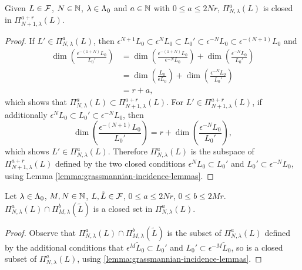 \documentclass[a4paper, 11pt, twoside]{report}
\begin{document}
\begin{lemma}\label{lemma:nesting-subvarieties}
Given $L\in\mathcal{F}$, $N\in\mathbb{N}$, $\lambda\in\Lambda_0{}$ and $a\in\mathbb{N}$ with $0\le a\le 2Nr$, $\Pi_{N,\lambda}^a(L)$ is closed in $\Pi_{N+1,\lambda}^{a+r}(L)$.
\end{lemma}

\begin{proof}
If $L'\in\Pi_{N,\lambda}^{a}(L)$, then $\epsilon^{N+1}L_0\subset \epsilon^N L_0\subset L_0'\subset\epsilon^{-N}L_0\subset\epsilon^{-(N+1)}L_0$ and
\begin{align*}
\dim\left(\frac{\epsilon^{-(1+N)}L_0}{L_0'}\right)
&=\dim\left(\frac{\epsilon^{-(1+N)}L_0}{\epsilon^{-N}L_0}\right) +\dim\left(\frac{\epsilon^{-N}L_0}{L_0'}\right)\\
&= \dim\left(\frac{L_0}{\epsilon L_0}\right) + \dim\left(\frac{\epsilon^{-N}L_0}{L_0'}\right)\\
&= r+a,
\end{align*}
which shows that $\Pi_{N,\lambda}^a(L)\subset \Pi_{N+1,\lambda}^{a+r}(L)$. For $L'\in\Pi_{N+1,\lambda}^{a+r}(L)$, if additionally $\epsilon^N L_0\subset L_0'\subset\epsilon^{-N}L_0$, then
\begin{equation*}
\dim\left(\frac{\epsilon^{-(N+1)}L_0}{L_0'}\right) = r + \dim\left(\frac{\epsilon^{-N}L_0}{L_0'}\right),
\end{equation*}
which shows $L'\in\Pi_{N,\lambda}^a(L)$. Therefore $\Pi_{N,\lambda}^a(L)$ is the subspace of $\Pi_{N+1,\lambda}^{a+r}(L)$ defined by the  two closed conditions $\epsilon^N L_0\subset L_0'$ and $L_0'\subset\epsilon^{-N}L_0$, using Lemma \ref{lemma:grassmannian-incidence-lemmas}.
\end{proof}

\begin{lemma}
Let $\lambda\in\Lambda_0{}$, $M,N\in\mathbb{N}$, $L,\tilde{L}\in\mathcal{F}$, $0\le a\le 2Nr$, $0\le b\le 2Mr$. $\Pi_{N,\lambda}^a(L)\cap \Pi_{M,\lambda}^b(\tilde{L})$ is a closed set in $\Pi_{N,\lambda}^a(L)$.
\end{lemma}

\begin{proof}
Observe that $\Pi_{N,\lambda}^a(L)\cap\Pi_{M,\lambda}^b(\tilde{L})$ is the subset of $\Pi_{N,\lambda}^a(L)$ defined by the additional conditions that $\epsilon^M \tilde{L}_0\subset L_0'$ and $L_0'\subset\epsilon^{-M}\tilde{L}_0$, so is a closed subset of $\Pi_{N,\lambda}^a(L)$, using \ref{lemma:grassmannian-incidence-lemmas}.
\end{proof}
\end{document}
